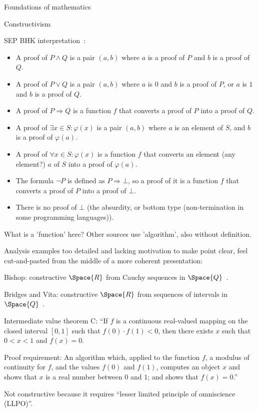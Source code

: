 \begin{plSection}{Foundations of mathematics}
\begin{plSection}{Constructivism}
\begin{plSection}{SEP}
BHK interpretation~\cite{wiki:BrouwerHeytingKolmogorovInterpretation}:
\begin{itemize}
  \item A proof of $P\wedge Q$ 
  is a pair $(a,b)$ where $a$ is a proof of $P$ 
  and $b$ is a proof of $Q$.
\item A proof of $P\vee Q$ is a pair $(a,b)$ 
where $a$ is $0$ and 
$b$ is a proof of $P$, 
or $a$ is $1$ 
and $b$ is a proof of $Q$.
\item A proof of $P\Rightarrow Q$ is 
a function $f$ that converts 
a proof of $P$ into a proof of $Q$.
\item A proof of $\exists x\in S:\varphi (x)$ is 
a pair $(a,b)$ where 
$a$ is an element of $S$, 
and $b$ is a proof of $\varphi (a)$.
\item A proof of $\forall x\in S:\varphi (x)$ is 
a function $f$ that converts 
an element (any element?) $a$ of $S$ into a proof of $\varphi (a)$.
\item The formula $\neg P$ is defined as $P\Rightarrow \bot$, 
so a proof of it is a function $f$ that converts 
a proof of $P$ into a proof of $\bot$.
\item There is no proof of $\bot$
(the absurdity, or bottom type 
(non-termination in some programming languages)).
\end{itemize}
What is a 'function' here? 
Other sources use 'algorithm', also without definition.

Analysis examples too detailed and lacking motivation 
to make point clear, feel cut-and-pasted from the middle
of a more coherent presentation:

Bishop: constructive $\Space{R}$ 
from Cauchy sequences 
in $\Space{Q}$~\cite{BishopBridges:1985:ConstructiveAnalysis}.

Bridges and Vita: constructive $\Space{R}$ from sequences
of intervals in $\Space{Q}$~\cite{Bridger:2019}.

Intermediate value theorem C: 
``If $f$ is a continuous real-valued mapping 
on the closed interval $[0,1]$ such that $f(0)⋅f(1)<0$, 
then there exists $x$ such that $0<x<1$ and $f(x)=0$.

Proof requirement: 
An algorithm which, applied to the function $f$, 
a modulus of continuity for $f$, and the values $f(0)$ and $f(1)$,
computes an object $x$ and shows that $x$ is a real number 
between $0$ and $1$; and
shows that $f(x)=0$.''~\cite{sep:ConstructiveMathematics}

Not constructive because it requires
``lesser limited principle of omniscience (LLPO)''.


\end{plSection}
\end{plSection}
\end{plSection}
